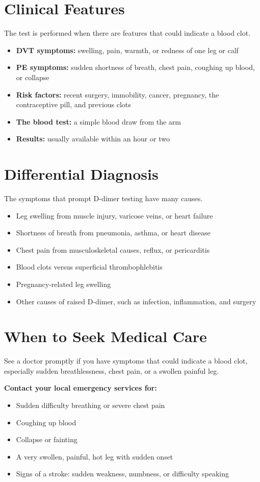 \section*{Clinical Features}
The test is performed when there are features that could indicate a blood clot.

\begin{itemize}
    \item \textbf{DVT symptoms:} swelling, pain, warmth, or redness of one leg or calf
    \item \textbf{PE symptoms:} sudden shortness of breath, chest pain, coughing up blood, or collapse
    \item \textbf{Risk factors:} recent surgery, immobility, cancer, pregnancy, the contraceptive pill, and previous clots
    \item \textbf{The blood test:} a simple blood draw from the arm
    \item \textbf{Results:} usually available within an hour or two
\end{itemize}

\section*{Differential Diagnosis}
The symptoms that prompt D-dimer testing have many causes.

\begin{itemize}
    \item Leg swelling from muscle injury, varicose veins, or heart failure
    \item Shortness of breath from pneumonia, asthma, or heart disease
    \item Chest pain from musculoskeletal causes, reflux, or pericarditis
    \item Blood clots versus superficial thrombophlebitis
    \item Pregnancy-related leg swelling
    \item Other causes of raised D-dimer, such as infection, inflammation, and surgery
\end{itemize}

\section*{When to Seek Medical Care}
See a doctor promptly if you have symptoms that could indicate a blood clot, especially sudden breathlessness, chest pain, or a swollen painful leg.

\textbf{Contact your local emergency services for:}
\begin{itemize}
    \item Sudden difficulty breathing or severe chest pain
    \item Coughing up blood
    \item Collapse or fainting
    \item A very swollen, painful, hot leg with sudden onset
    \item Signs of a stroke: sudden weakness, numbness, or difficulty speaking
\end{itemize}

